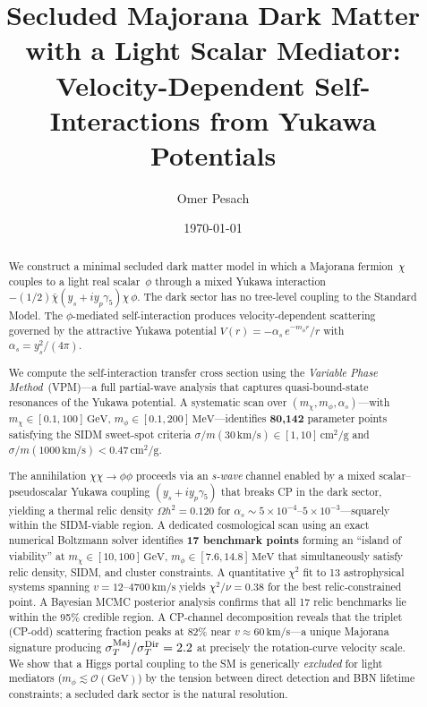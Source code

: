 \documentclass[aps,prd,twocolumn,superscriptaddress,nofootinbib]{revtex4-2}
\newcommand{\sigmam}{\sigma/m}
\newcommand{\GeV}{\,\text{GeV}}
\newcommand{\MeV}{\,\text{MeV}}
\newcommand{\kms}{\,\text{km/s}}
\newcommand{\cmg}{\,\text{cm}^2/\text{g}}
\newcommand{\mchi}{m_\chi}
\newcommand{\mphi}{m_\phi}
\newcommand{\OmH}{\Omega h^2}
\begin{document}
\title{Secluded Majorana Dark Matter with a Light Scalar Mediator:\\Velocity-Dependent Self-Interactions from Yukawa Potentials}

\author{Omer Pesach}

\date{\today}

\begin{abstract}
We construct a minimal secluded dark matter model in which a Majorana
fermion~$\chi$ couples to a light real scalar~$\phi$ through a
mixed Yukawa interaction
$-(1/2)\bar\chi(y_s+iy_p\gamma_5)\chi\,\phi$.
The dark sector has no
tree-level coupling to the Standard Model.  The $\phi$-mediated
self-interaction produces velocity-dependent scattering governed by the
attractive Yukawa potential $V(r)=-\alpha_s\,e^{-\mphi r}/r$ with
$\alpha_s=y_s^{2}/(4\pi)$.

We compute the self-interaction transfer cross section using the
\emph{Variable Phase Method}~(VPM)---a full partial-wave analysis that
captures quasi-bound-state resonances of the Yukawa potential.  A
systematic scan over $(\mchi,\mphi,\alpha_s)$---with
$\mchi\in[0.1,100]\GeV$, $\mphi\in[0.1,200]\MeV$---identifies
\textbf{80,142} parameter points satisfying the SIDM
sweet-spot criteria
$\sigmam(30\kms)\in[1,10]\cmg$ and
$\sigmam(1000\kms)<0.47\cmg$.

The annihilation $\chi\chi\to\phi\phi$ proceeds via an \emph{s-wave}
channel enabled by a mixed scalar--pseudoscalar Yukawa coupling
$(y_s + iy_p\gamma_5)$ that breaks CP in the dark sector, yielding a
thermal relic density $\OmH=0.120$ for
$\alpha_s\sim 5\times10^{-4}\text{--}5\times10^{-3}$---squarely within
the SIDM-viable region.  A dedicated cosmological scan using an exact
numerical Boltzmann solver identifies \textbf{17 benchmark
points} forming an ``island of viability'' at
$\mchi\in[10,100]\GeV$, $\mphi\in[7.6,14.8]\MeV$ that simultaneously
satisfy relic density, SIDM, and cluster constraints.  A quantitative
$\chi^{2}$ fit to 13 astrophysical systems spanning $v=12$--$4700\kms$
yields $\chi^{2}/\nu=0.38$ for the best relic-constrained
point.  A Bayesian MCMC posterior analysis confirms that all
17 relic benchmarks lie within the 95\% credible region.
A CP-channel decomposition reveals that the triplet (CP-odd) scattering
fraction peaks at 82\% near $v\approx 60\kms$---a unique Majorana
signature producing $\sigma_T^{\rm Maj}/\sigma_T^{\rm Dir}=2.2$ at
precisely the rotation-curve velocity scale.  We
show that a Higgs portal coupling to the SM is generically
\emph{excluded} for light mediators
($\mphi\lesssim\mathcal{O}(\text{GeV})$) by the tension between direct
detection and BBN lifetime constraints; a secluded dark sector is the
natural resolution.
\end{abstract}
\end{document}
